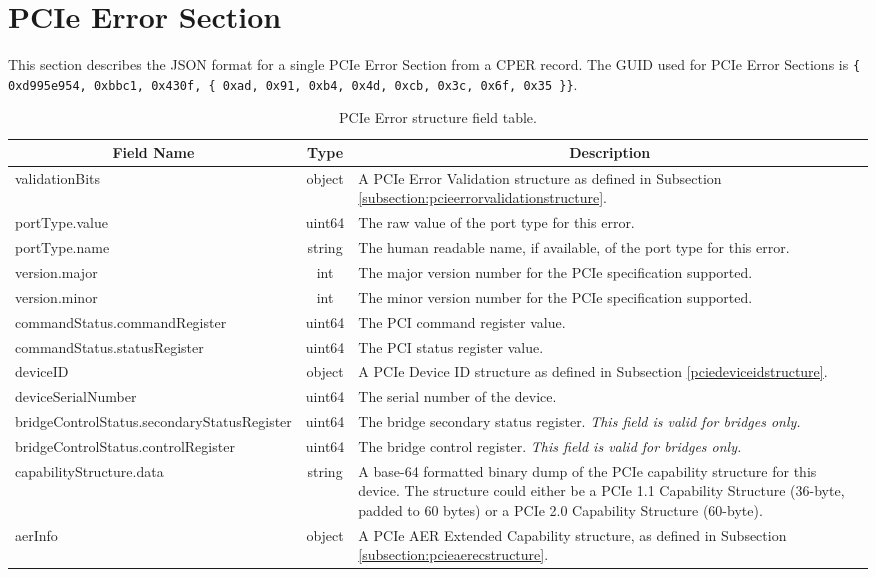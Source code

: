 \documentclass{report}
\newcommand*{\thead}[1]{\multicolumn{1}{|c|}{\bfseries #1}}
\newcommand*{\jsontable}[1]{
    \begin{table}[!ht]
    \label{#1}
    \centering
    \begin{adjustbox}{center}
    \begin{tabular}{|l|c|p{8cm}|}
    \hline
    \thead{Field Name} & \thead{Type} & \thead{Description} \\
    \hline
}
\newcommand*{\jsontableend}[1]{
    \hline
    \end{tabular}
    \end{adjustbox}
    \caption{#1}
    \label{table:#1}
    \end{table}
    \FloatBarrier
}
\begin{document}
\section{PCIe Error Section}
\label{section:pcieerrorsection}
This section describes the JSON format for a single PCIe Error Section from a CPER record. The GUID used for PCIe Error Sections is \texttt{\{ 0xd995e954, 0xbbc1, 0x430f, \{ 0xad, 0x91, 0xb4, 0x4d, 0xcb, 0x3c, 0x6f, 0x35 \}\}}.
\jsontable{table:pcieerrorsection}
validationBits & object & A PCIe Error Validation structure as defined in Subsection \ref{subsection:pcieerrorvalidationstructure}.\\
\hline
portType.value & uint64 & The raw value of the port type for this error.\\
portType.name & string & The human readable name, if available, of the port type for this error.\\
\hline
version.major & int & The major version number for the PCIe specification supported.\\
version.minor & int & The minor version number for the PCIe specification supported.\\
\hline
commandStatus.commandRegister & uint64 & The PCI command register value.\\
commandStatus.statusRegister & uint64 & The PCI status register value.\\
\hline
deviceID & object & A PCIe Device ID structure as defined in Subsection \ref{pciedeviceidstructure}.\\
\hline
deviceSerialNumber & uint64 & The serial number of the device.\\
\hline
bridgeControlStatus.secondaryStatusRegister & uint64 & The bridge secondary status register. \emph{This field is valid for bridges only.}\\
\hline
bridgeControlStatus.controlRegister & uint64 & The bridge control register. \emph{This field is valid for bridges only.}\\
\hline
capabilityStructure.data & string & A base-64 formatted binary dump of the PCIe capability structure for this device. The structure could either be a PCIe 1.1 Capability Structure (36-byte, padded to 60 bytes) or a PCIe 2.0 Capability Structure (60-byte).\\
\hline
aerInfo & object & A PCIe AER Extended Capability structure, as defined in Subsection \ref{subsection:pcieaerecstructure}.\\
\jsontableend{PCIe Error structure field table.}
\end{document}
